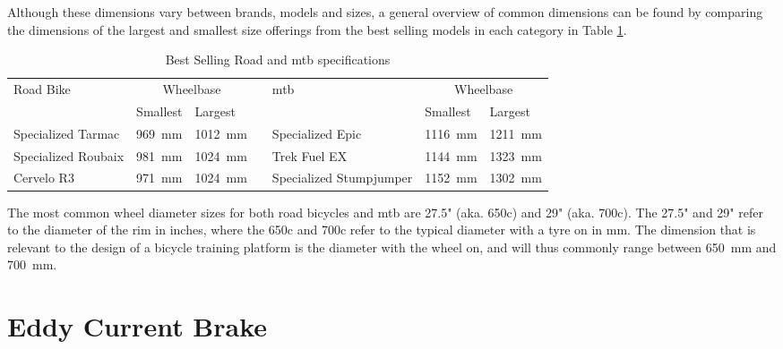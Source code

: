 Although these dimensions vary between brands, models and sizes, a general overview of common dimensions can be found by comparing the dimensions of the largest and smallest size offerings from the best selling models in each category in Table \ref{tab:bikes}. \citep{Lin:2021} 

\begin{table}[H]
	\renewcommand{\arraystretch}{\tablestretch}
	\centering
	\caption{Best Selling Road and \ac{mtb} specifications}
	\citep{Geometry:2022}
	\begin{tabularx}{\textwidth}{p{2.6cm} X Xp{0.05cm} p{2.6cm} X X}
		\toprule
		Road Bike           & \multicolumn{2}{c}{Wheelbase} &                         & \ac{mtb} & \multicolumn{2}{c}{Wheelbase}                                                     \\
		                    & Smallest                      & Largest                 &          &                               & Smallest                & Largest                 \\
		\midrule
		Specialized Tarmac  & \SI{969}{\milli\meter}        & \SI{1012}{\milli\meter} &          & Specialized Epic              & \SI{1116}{\milli\meter} & \SI{1211}{\milli\meter} \\
		Specialized Roubaix & \SI{981}{\milli\meter}        & \SI{1024}{\milli\meter} &          & Trek Fuel EX                  & \SI{1144}{\milli\meter} & \SI{1323}{\milli\meter} \\
		Cervelo R3          & \SI{971}{\milli\meter}        & \SI{1024}{\milli\meter} &          & Specialized Stumpjumper       & \SI{1152}{\milli\meter} & \SI{1302}{\milli\meter} \\
		\bottomrule
	\end{tabularx}
	\label{tab:bikes}
\end{table}

The most common wheel diameter sizes for both road bicycles and \ac{mtb} are 27.5" (aka. 650c) and 29" (aka. 700c). The 27.5" and 29" refer to the diameter of the rim in inches, where the 650c and 700c refer to the typical diameter with a tyre on in \si{\milli\meter}. The dimension that is relevant to the design of a bicycle training platform is the diameter with the wheel on, and will thus commonly range between \SI{650}{\milli\meter} and \SI{700}{\milli\meter}. \citep{Montague:2019}

\section{Eddy Current Brake}

